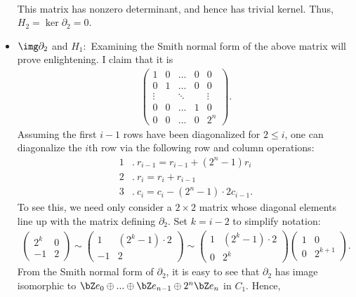\begin{homework}[e]
\begin{prf}
\begin{itemize}
\begin{align*}
      \end{align*}
      This matrix has nonzero determinant, and hence has trivial kernel. Thus, $H_2 = \ker \partial_2 = 0$.
    \item $\img \partial_2$ and $H_1:$ Examining the Smith normal form of the above matrix will prove enlightening. I claim that it is 
      \begin{align*}
        \begin{pmatrix}	
          1 & 0 & ... & 0 & 0 \\
          0 & 1 & ... & 0 & 0 \\
          \vdots & & \ddots & & \vdots \\
          0 & 0 & ... & 1 & 0 \\
          0 & 0 & ... & 0 & 2^n
        \end{pmatrix}.
      \end{align*}
      Assuming the first $i-1$ rows have been diagonalized for $2\leq i$, one can diagonalize the $i$th row via the following row and column operations:
      \begin{align*}
        1&. ~ r_{i-1} = r_{i-1} + (2^n - 1)r_i \\
        2&. ~ r_i = r_i + r_{i-1} \\
        3&. ~ c_i = c_i - (2^n - 1)\cdot 2 c_{i-1}.
      \end{align*}
      To see this, we need only consider a $2\times 2$ matrix whose diagonal elements line up with the matrix defining $\partial_2$. Set $k = i - 2$ to simplify notation:
      \begin{align*}
        \begin{pmatrix}	
          2^k & 0 \\
          -1 & 2
        \end{pmatrix}\sim
        \begin{pmatrix}
          1 & (2^k - 1)\cdot 2 \\
          -1 & 2
        \end{pmatrix}\sim
        \begin{pmatrix}
          1 & (2^k - 1)\cdot 2 \\
          0 & 2^k
        \end{pmatrix}
        \begin{pmatrix}
          1 & 0 \\
          0 & 2^{k+1}
        \end{pmatrix}.
      \end{align*}
      From the Smith normal form of $\partial_2$, it is easy to see that $\partial_2$ has image isomorphic to $\bZ e_0 \oplus ... \oplus \bZ e_{n-1} \oplus 2^n\bZ e_{n}$ in $C_1$. Hence,

\end{itemize}
\end{prf}
\end{homework}
